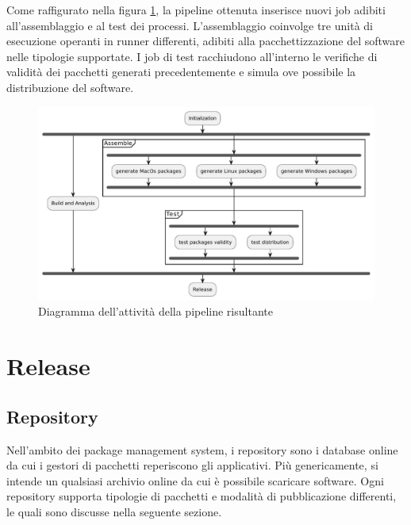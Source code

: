 Come raffigurato nella figura \ref{fig:pipeline-activity-diagram}, la pipeline ottenuta inserisce nuovi job adibiti all'assemblaggio e al test dei processi. L'assemblaggio coinvolge tre unità di esecuzione operanti in runner differenti, adibiti alla pacchettizzazione del software nelle tipologie supportate. I job di test racchiudono all'interno le verifiche di validità dei pacchetti generati precedentemente e simula ove possibile la distribuzione del software.
\begin{figure}[htb]
	\centering
	\includegraphics[width=1\linewidth]{figures/pipeline-result.pdf}
	\caption{Diagramma dell'attività della pipeline risultante}
	\label{fig:pipeline-activity-diagram}
\end{figure}

\newpage
\section{Release}

\subsection{Repository}
Nell'ambito dei package management system, i repository sono i database online da cui i gestori di pacchetti reperiscono gli applicativi. Più genericamente, si intende un qualsiasi archivio online da cui è possibile scaricare software. Ogni repository supporta tipologie di pacchetti e modalità di pubblicazione differenti, le quali sono discusse nella seguente sezione.

